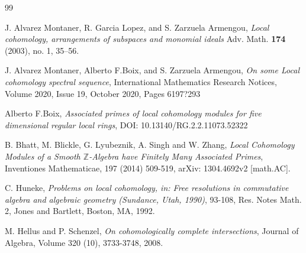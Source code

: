 \documentclass[10pt]{amsart}
\theoremstyle{plain}
\theoremstyle{definition}
\newcommand{\ZZ}{{\mathbb Z}}
\begin{document}
 \begin{thebibliography}{99}

 J. Alvarez Montaner, R. Garcia Lopez, and S. Zarzuela
Armengou, {\it Local cohomology, arrangements of subspaces and
monomial ideals}  Adv. Math.  {\bf 174}  (2003),  no. 1, 35--56. 

 J. Alvarez Montaner, Alberto F.Boix, and S. Zarzuela
Armengou, {\it On some Local cohomology spectral sequence}, International Mathematics Research Notices, Volume 2020, Issue 19, October 2020, Pages 6197?293

 Alberto F.Boix, {\it Associated primes of local cohomology modules for five dimensional regular local rings}, DOI: 10.13140/RG.2.2.11073.52322

B. Bhatt, M. Blickle, G. Lyubeznik, A. Singh and W. Zhang, {\it Local Cohomology Modules of a Smooth $\ZZ$-Algebra have Finitely Many Associated Primes}, Inventiones Mathematicae, 197 (2014) 509-519, arXiv: 1304.4692v2 [math.AC].



C. Huneke, {\it Problems on local cohomology, in: Free resolutions in commutative algebra and algebraic
geometry (Sundance, Utah, 1990)}, 93-108, Res. Notes Math. 2, Jones and Bartlett, Boston, MA, 1992.


M. Hellus and P. Schenzel, {\it On cohomologically complete intersections}, Journal of Algebra, Volume 320 (10), 3733-3748, 2008. 


\end{thebibliography}
\end{document}
